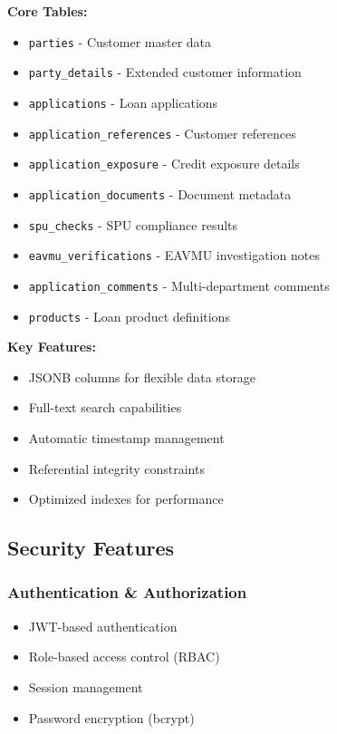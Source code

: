 \documentclass[12pt,a4paper]{article}
\begin{document}
\textbf{Core Tables:}
\begin{itemize}[noitemsep]
    \item \texttt{parties} - Customer master data
    \item \texttt{party\_details} - Extended customer information
    \item \texttt{applications} - Loan applications
    \item \texttt{application\_references} - Customer references
    \item \texttt{application\_exposure} - Credit exposure details
    \item \texttt{application\_documents} - Document metadata
    \item \texttt{spu\_checks} - SPU compliance results
    \item \texttt{eavmu\_verifications} - EAVMU investigation notes
    \item \texttt{application\_comments} - Multi-department comments
    \item \texttt{products} - Loan product definitions
\end{itemize}

\textbf{Key Features:}
\begin{itemize}
    \item JSONB columns for flexible data storage
    \item Full-text search capabilities
    \item Automatic timestamp management
    \item Referential integrity constraints
    \item Optimized indexes for performance
\end{itemize}

\newpage

\subsection{Security Features}

\subsubsection{Authentication \& Authorization}
\begin{itemize}
    \item JWT-based authentication
    \item Role-based access control (RBAC)
    \item Session management
    \item Password encryption (bcrypt)
\end{itemize}
\end{document}
